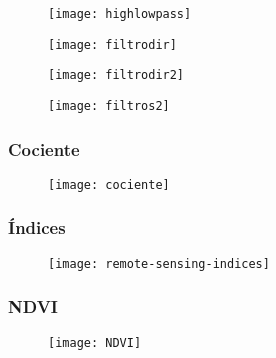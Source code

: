 \documentclass[14pt]{beamer}
\begin{document}
\begin{frame}
  \begin{figure}
    \centering
    \texttt{[image: highlowpass]}
  \end{figure}
\tiny{}
\end{frame}
\begin{frame}
  \begin{figure}
    \centering
    \texttt{[image: filtrodir]}
  \end{figure}
\tiny{}
\end{frame}
\begin{frame}
  \begin{figure}
    \centering
    \texttt{[image: filtrodir2]}
  \end{figure}
\tiny{}
\end{frame}
\begin{frame}
  \begin{figure}
    \centering
    \texttt{[image: filtros2]}
  \end{figure}
\tiny{}
\end{frame}
\begin{frame}
\frametitle{Cociente}
  \begin{figure}
    \centering
    \texttt{[image: cociente]}
  \end{figure}
\tiny{}
\end{frame}
\begin{frame}
\frametitle{Índices}
  \begin{figure}
    \centering
    \texttt{[image: remote-sensing-indices]}
  \end{figure}
\tiny{}
\end{frame}
\begin{frame}
\frametitle{NDVI}
  \begin{figure}
    \centering
    \texttt{[image: NDVI]}
  \end{figure}
\tiny{}
\end{frame}
\end{document}
